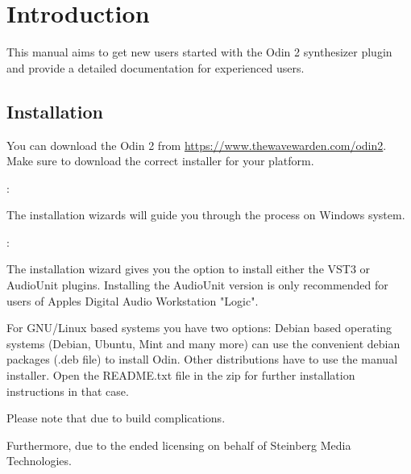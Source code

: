 \chapter{Introduction}

This manual aims to get new users started with the Odin 2 synthesizer plugin and provide a detailed documentation for experienced users.

\section{Installation}
You can download the Odin 2 from \url{https://www.thewavewarden.com/odin2}. Make sure to download the correct installer for your platform.

\vspace{3mm}
:

The installation wizards will guide you through the process on Windows system.

\vspace{3mm}
:

The installation wizard gives you the option to install either the VST3 or AudioUnit plugins. Installing the AudioUnit version is only recommended for users of Apples Digital Audio Workstation "Logic".

\vspace{3mm}

For GNU/Linux based systems you have two options: Debian based operating systems (Debian, Ubuntu, Mint and many more) can use the convenient debian packages (.deb file) to install Odin. Other distributions have to use the manual installer. Open the README.txt file in the zip for further installation instructions in that case.

\vspace{5mm}
\begin{tcolorbox}[colback=yellow!10!white,
    colframe=white!20!black,
    center,
    valign=top,
    halign=left,
    center title,
    width=\textwidth]

    Please note that  due to build complications.
    
    Furthermore, due to the ended licensing on behalf of Steinberg Media Technologies.
\end{tcolorbox}
\clearpage
